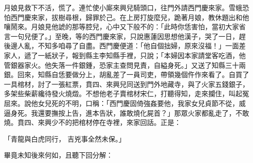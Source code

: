 \begin{showcontents}{}
月娘見救下不活，慌了。連忙使小廝來興兒騎頭口，往門外請西門慶來家。雪蛾恐怕西門慶來家，拔樹尋根，歸罪於己。在上房打旋麼兒，跪著月娘，教休題出和他嚷鬧來。月娘見他諕的那等腔兒，心中又下般不的：「此時你恁害怕，當初大家省言一句兒便了。」至晚，等的西門慶來家，只說惠蓮因思想他漢子，哭了一日，趕後邊人亂，不知多咱尋了自盡。西門慶便道：「他自個拙婦，原來沒福！」一面差家人，遞了一紙狀子，報到縣主李知縣手裡，只說；「本婦因本家請堂客吃酒，他管銀器家火。他失落一件銀鍾，恐家主查問見責，自縊身死。」又送了知縣三十兩銀。回來，知縣自恁要做分上，胡亂差了一員司吏，帶領幾個仵作來看了。自買了一具棺材，討了一張紅票，賁四、來興兒同送到門外地藏寺，與了火家五錢銀子，多架些柴薪纔待發火燒燬。不想他老子賣棺材宋仁，打聽得知，走來攔住，叫起冤屈來。說他女兒死的不明，口稱：「西門慶固倚強姦要他，我家女兒貞節不從，威逼身死。我還要撫按上告，進本告狀，誰敢燒化屍首？」那眾火家都亂走了，不敢燒。賁四、來興少不的把棺材停在寺裡，來家回話。正是：

「青龍與白虎同行，  吉兇事全然未保。」

畢竟未知後來何如，且聽下回分解：





\end{showcontents}


